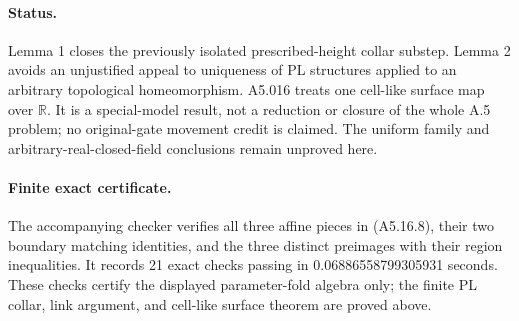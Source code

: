 \paragraph{Status.}
Lemma 1 closes the previously isolated prescribed-height collar substep.
Lemma 2 avoids an unjustified appeal to uniqueness of PL structures applied
to an arbitrary topological homeomorphism. A5.016 treats one cell-like
surface map over $\mathbb R$. It is a special-model result, not a reduction
or closure of the whole A.5 problem; no original-gate movement credit is
claimed. The uniform family and arbitrary-real-closed-field conclusions
remain unproved here.

\paragraph{Finite exact certificate.}
The accompanying checker
verifies all three affine pieces in (A5.16.8), their two boundary matching identities, and the three distinct preimages with their region inequalities. It records 21 exact checks passing in 0.06886558799305931 seconds. These checks certify the displayed parameter-fold algebra only; the finite PL collar, link argument, and cell-like surface theorem are proved above.

